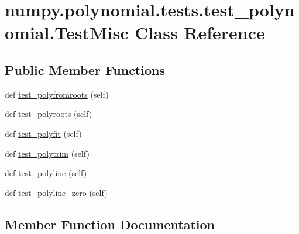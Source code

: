 \hypertarget{classnumpy_1_1polynomial_1_1tests_1_1test__polynomial_1_1TestMisc}{}\section{numpy.\+polynomial.\+tests.\+test\+\_\+polynomial.\+Test\+Misc Class Reference}
\label{classnumpy_1_1polynomial_1_1tests_1_1test__polynomial_1_1TestMisc}
\subsection*{Public Member Functions}
\begin{DoxyCompactItemize}
\item 
def \hyperlink{classnumpy_1_1polynomial_1_1tests_1_1test__polynomial_1_1TestMisc_a0674e07ad5941a0c3477ba6529078b46}{test\+\_\+polyfromroots} (self)
\item 
def \hyperlink{classnumpy_1_1polynomial_1_1tests_1_1test__polynomial_1_1TestMisc_a4d46813fb2eca5732dd522f2e7673e08}{test\+\_\+polyroots} (self)
\item 
def \hyperlink{classnumpy_1_1polynomial_1_1tests_1_1test__polynomial_1_1TestMisc_a1c000ea4f569a2923b59eb555ee92e07}{test\+\_\+polyfit} (self)
\item 
def \hyperlink{classnumpy_1_1polynomial_1_1tests_1_1test__polynomial_1_1TestMisc_a948522ff23d54a752994927c210eadeb}{test\+\_\+polytrim} (self)
\item 
def \hyperlink{classnumpy_1_1polynomial_1_1tests_1_1test__polynomial_1_1TestMisc_abd954ae1f073582cabdbb792705082ee}{test\+\_\+polyline} (self)
\item 
def \hyperlink{classnumpy_1_1polynomial_1_1tests_1_1test__polynomial_1_1TestMisc_a7b5464f4a2a736291da85211e1c3db56}{test\+\_\+polyline\+\_\+zero} (self)
\end{DoxyCompactItemize}


\subsection{Member Function Documentation}
\mbox{\label{classnumpy_1_1polynomial_1_1tests_1_1test__polynomial_1_1TestMisc_a1c000ea4f569a2923b59eb555ee92e07}} 
